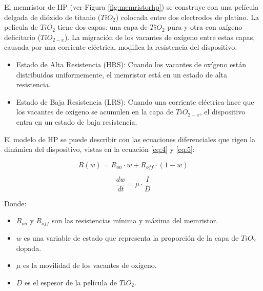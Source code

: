 \documentclass[conference]{IEEEtran}
\begin{document}
El memristor de HP (ver Figura \ref{fig:memristorhp}) se construye con una película delgada de dióxido de titanio ($TiO_{2}$) colocada entre dos electrodos de platino. La película de $TiO_{2}$ tiene dos capas: una capa de $TiO_{2}$ pura y otra con oxígeno deficitario ($TiO_{2-x}$). La migración de los vacantes de oxígeno entre estas capas, causada por una corriente eléctrica, modifica la resistencia del dispositivo. \cite{HP3}

\begin{itemize}
	\item Estado de Alta Resistencia (HRS): Cuando los vacantes de oxígeno están distribuidos uniformemente, el memristor está en un estado de alta resistencia.
	\item Estado de Baja Resistencia (LRS): Cuando una corriente eléctrica hace que los vacantes de oxígeno se acumulen en la capa de $TiO_{2-x}$, el dispositivo entra en un estado de baja resistencia.
\end{itemize}

El modelo de HP se puede describir con las ecuaciones diferenciales que rigen la dinámica del dispositivo, vistas en la ecuación \ref{eq:4} y \ref{eq:5}:

\begin{equation}
	R(w) = R_{on} \cdot w + R_{off} \cdot (1 - w)
	\label{eq:4}
\end{equation}

\begin{equation}
	\frac{dw}{dt} = \mu \cdot \frac{I}{D}
	\label{eq:5}
\end{equation}

Donde:
\begin{itemize}
	\item $R_{on}$ y $R_{off}$ son las resistencias mínima y máxima del memristor.
	\item $w$ es una variable de estado que representa la proporción de la capa de $TiO_{2}$ dopada.
	\item $\mu$ es la movilidad de los vacantes de oxígeno.
	\item $D$ es el espesor de la película de $TiO_{2}$.
\end{itemize}
\end{document}
